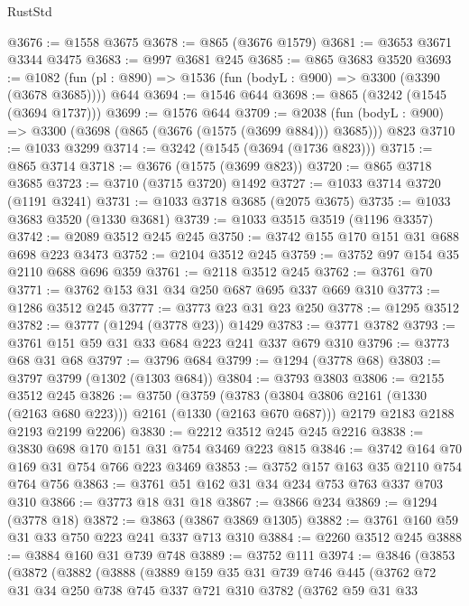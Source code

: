 \begin{lexlean}{RustStd}
\begin{coremodule}
@3676 := @1558 @3675
@3678 := @865 (@3676 @1579)
@3681 := @3653 @3671 @3344 @3475
@3683 := @997 @3681 @245
@3685 := @865 @3683 @3520
@3693 := @1082 (fun (pl : @890) => @1536 (fun (bodyL : @900) => @3300 (@3390 (@3678 @3685)))) @644
@3694 := @1546 @644
@3698 := @865 (@3242 (@1545 (@3694 @1737)))
@3699 := @1576 @644
@3709 := @2038 (fun (bodyL : @900) => @3300 (@3698 (@865 (@3676 (@1575 (@3699 @884))) @3685))) @823
@3710 := @1033 @3299
@3714 := @3242 (@1545 (@3694 (@1736 @823)))
@3715 := @865 @3714
@3718 := @3676 (@1575 (@3699 @823))
@3720 := @865 @3718 @3685
@3723 := @3710 (@3715 @3720) @1492
@3727 := @1033 @3714 @3720 (@1191 @3241)
@3731 := @1033 @3718 @3685 (@2075 @3675)
@3735 := @1033 @3683 @3520 (@1330 @3681)
@3739 := @1033 @3515 @3519 (@1196 @3357)
@3742 := @2089 @3512 @245 @245
@3750 := @3742 @155 @170 @151 @31 @688 @698 @223 @3473
@3752 := @2104 @3512 @245
@3759 := @3752 @97 @154 @35 @2110 @688 @696 @359
@3761 := @2118 @3512 @245
@3762 := @3761 @70
@3771 := @3762 @153 @31 @34 @250 @687 @695 @337 @669 @310
@3773 := @1286 @3512 @245
@3777 := @3773 @23 @31 @23 @250
@3778 := @1295 @3512
@3782 := @3777 (@1294 (@3778 @23)) @1429
@3783 := @3771 @3782
@3793 := @3761 @151 @59 @31 @33 @684 @223 @241 @337 @679 @310
@3796 := @3773 @68 @31 @68
@3797 := @3796 @684
@3799 := @1294 (@3778 @68)
@3803 := @3797 @3799 (@1302 (@1303 @684))
@3804 := @3793 @3803
@3806 := @2155 @3512 @245
@3826 := @3750
    (@3759
      (@3783 (@3804 @3806 @2161 (@1330 (@2163 @680 @223))) @2161 (@1330 (@2163 @670 @687)))
      @2179
      @2183
      @2188
      @2193
      @2199
      @2206)
@3830 := @2212 @3512 @245 @245 @2216
@3838 := @3830 @698 @170 @151 @31 @754 @3469 @223 @815
@3846 := @3742 @164 @70 @169 @31 @754 @766 @223 @3469
@3853 := @3752 @157 @163 @35 @2110 @754 @764 @756
@3863 := @3761 @51 @162 @31 @34 @234 @753 @763 @337 @703 @310
@3866 := @3773 @18 @31 @18
@3867 := @3866 @234
@3869 := @1294 (@3778 @18)
@3872 := @3863 (@3867 @3869 @1305)
@3882 := @3761 @160 @59 @31 @33 @750 @223 @241 @337 @713 @310
@3884 := @2260 @3512 @245
@3888 := @3884 @160 @31 @739 @748
@3889 := @3752 @111
@3974 := @3846
    (@3853
      (@3872
        (@3882
          (@3888
            (@3889
              @159
              @35
              @31
              @739
              @746
              @445
              (@3762
                @72
                @31
                @34
                @250
                @738
                @745
                @337
                @721
                @310
                @3782
                (@3762
                  @59
                  @31
                  @33

\end{coremodule}
\end{lexlean}
